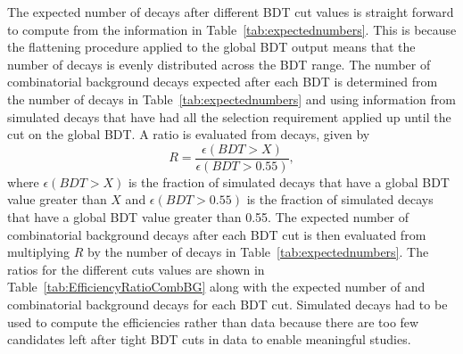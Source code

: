 The expected number of \bsmumu decays after different BDT cut values is straight forward to compute from the information in Table~\ref{tab:expectednumbers}. This is because  the flattening procedure applied to the global BDT output means that the number of \bsmumu decays is evenly distributed across the BDT range. The number of combinatorial background decays expected after each BDT is determined from the number of decays in Table~\ref{tab:expectednumbers} and using information from simulated \bbbarmumux decays that have had all the \el selection requirement applied up until the cut on the global BDT. 
A ratio is evaluated from \bbbarmumux decays, given by
\begin{equation}
R = \frac{\epsilon(BDT > X)}{\epsilon(BDT > 0.55)},
\end{equation}
where $\epsilon(BDT > X)$ is the fraction of simulated \bbbarmumux decays that have a global BDT value greater than $X$ and $\epsilon(BDT > 0.55)$ is the fraction of simulated \bbbarmumux decays that have a global BDT value greater than 0.55. The expected number of combinatorial background decays after each BDT cut is then evaluated from multiplying $R$ by the number of decays in Table~\ref{tab:expectednumbers}.
The ratios for the different cuts values are shown in Table~\ref{tab:EfficiencyRatioCombBG} along with the expected number of \bsmumu and combinatorial background decays for each BDT cut. Simulated decays had to be used to compute the efficiencies rather than data because there are too few candidates left after tight BDT cuts in  data to enable meaningful studies. 







